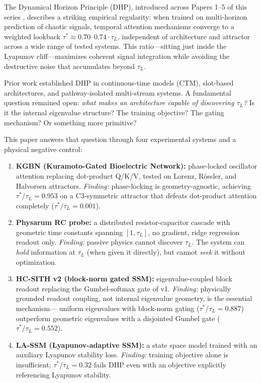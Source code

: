\documentclass[12pt]{article}
\theoremstyle{definition}
\begin{document}
The Dynamical Horizon Principle (DHP), introduced across Papers 1--5 of this series
\citep{archon2026a,archon2026b,archon2026c,archon2026d,archon2026e}, describes a striking empirical regularity:
when trained on multi-horizon prediction of chaotic signals, temporal attention
mechanisms converge to a weighted lookback $\tau^* \approx 0.70$--$0.74 \cdot \tau_L$,
independent of architecture and attractor across a wide range of tested systems.
This ratio---sitting just inside the Lyapunov cliff---maximizes coherent signal
integration while avoiding the destructive noise that accumulates beyond $\tau_L$.

Prior work established DHP in continuous-time models (CTM), slot-based architectures,
and pathway-isolated multi-stream systems. A fundamental question remained open:
\emph{what makes an architecture capable of discovering $\tau_L$?} Is it the
internal eigenvalue structure? The training objective? The gating mechanism? Or
something more primitive?

This paper answers that question through four experimental systems and a physical
negative control:

\begin{enumerate}
  \item \textbf{KGBN (Kuramoto-Gated Bioelectric Network):} phase-locked oscillator
    attention replacing dot-product Q/K/V, tested on Lorenz, R\"{o}ssler, and Halvorsen
    attractors. \emph{Finding:} phase-locking is geometry-agnostic, achieving
    $\tau^*/\tau_L = 0.953$ on a C3-symmetric attractor that defeats dot-product
    attention completely ($\tau^*/\tau_L = 0.001$).

  \item \textbf{Physarum RC probe:} a distributed resistor-capacitor cascade with
    geometric time constants spanning $[1, \tau_L]$, no gradient, ridge regression
    readout only. \emph{Finding:} passive physics cannot discover $\tau_L$. The system
    can \emph{hold} information at $\tau_L$ (when given it directly), but cannot
    \emph{seek} it without optimization.

  \item \textbf{HC-SITH v2 (block-norm gated SSM):} eigenvalue-coupled block readout
    replacing the Gumbel-softmax gate of v1. \emph{Finding:} physically grounded
    readout coupling, not internal eigenvalue geometry, is the essential mechanism---
    uniform eigenvalues with block-norm gating ($\tau^*/\tau_L = 0.887$) outperform
    geometric eigenvalues with a disjointed Gumbel gate ($\tau^*/\tau_L = 0.552$).

  \item \textbf{LA-SSM (Lyapunov-adaptive SSM):} a state space model trained with
    an auxiliary Lyapunov stability loss. \emph{Finding:} training objective alone
    is insufficient; $\tau^*/\tau_L = 0.32$ fails DHP even with an objective
    explicitly referencing Lyapunov stability.
\end{enumerate}
\end{document}
